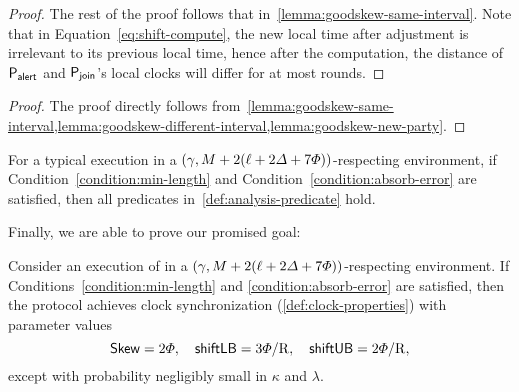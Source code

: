 \begin{proof}
    The rest of the proof follows that in~\cref{lemma:goodskew-same-interval}.
    Note that in Equation~\eqref{eq:shift-compute}, the new local time after adjustment is irrelevant to its previous local time, hence after the computation, the distance of $\mathsf{P}_{\mathsf{alert}}$ and $\mathsf{P}_{\mathsf{join}}$'s local clocks will differ for at most \maxskew rounds.
\end{proof}

\lemmagoodskew

\begin{proof}
    The proof directly follows from~\cref{lemma:goodskew-same-interval,lemma:goodskew-different-interval,lemma:goodskew-new-party}.
\end{proof}

\begin{theorem} \label{thm:analysis-predicates}
    For a typical execution in a $(\gamma, M + 2(\ell + 2\varDelta + 7\varPhi))$-respecting environment, if Condition~\eqref{condition:min-length} and Condition~\eqref{condition:absorb-error} are satisfied, then all predicates in~\cref{def:analysis-predicate} hold.
\end{theorem}

Finally, we are able to prove our promised goal:

\begin{theorem} \label{thm:clock-properties}
    Consider an execution of \timekeeper in a $(\gamma, M + 2(\ell + 2\varDelta + 7\varPhi))$-respecting environment.
    If Conditions~\eqref{condition:min-length} and \eqref{condition:absorb-error} are satisfied, then the protocol achieves clock synchronization (\cref{def:clock-properties}) with parameter values
    \[ \mathsf{Skew} = 2\varPhi, \quad \mathsf{shiftLB} = 3\varPhi / \mathrm{R}, \quad \mathsf{shiftUB} = 2\varPhi / \mathrm{R}, \]
    except with probability negligibly small in $\kappa$ and $\lambda$.
\end{theorem}

